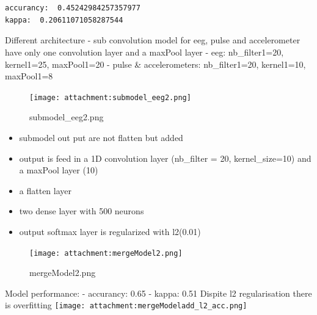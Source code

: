 \documentclass[11pt]{article}
\providecommand{\tightlist}{%
      \setlength{\itemsep}{0pt}\setlength{\parskip}{0pt}}
\begin{document}
    \begin{center}
    \end{center}
    { \hspace*{\fill} \\}
    
    \begin{center}
    \end{center}
    { \hspace*{\fill} \\}
    
    \begin{Verbatim}[commandchars=\\\{\}]
accurancy:  0.45242984257357977
kappa:  0.20611071058287544

    \end{Verbatim}

    Different architecture - sub convolution model for eeg, pulse and
accelerometer have only one convolution layer and a maxPool layer - eeg:
nb\_filter1=20, kernel1=25, maxPool1=20 - pulse \& accelerometers:
nb\_filter1=20, kernel1=10, maxPool1=8

\begin{figure}
\centering
\texttt{[image: attachment:submodel\_eeg2.png]}
\caption{submodel\_eeg2.png}
\end{figure}

\begin{itemize}
\tightlist
\item
  submodel out put are not flatten but added 
\item
  output is feed in a 1D convolution layer (nb\_filter = 20,
  kernel\_size=10) and a maxPool layer (10)
\item
  a flatten layer
\item
  two dense layer with 500 neurons
\item
  output softmax layer is regularized with l2(0.01)
\end{itemize}

\begin{figure}
\centering
\texttt{[image: attachment:mergeModel2.png]}
\caption{mergeModel2.png}
\end{figure}

 Model performance: - accurancy: 0.65 - kappa: 0.51 Dispite l2
regularisation there is overfitting
\texttt{[image: attachment:mergeModeladd\_l2\_acc.png]}
\end{document}
